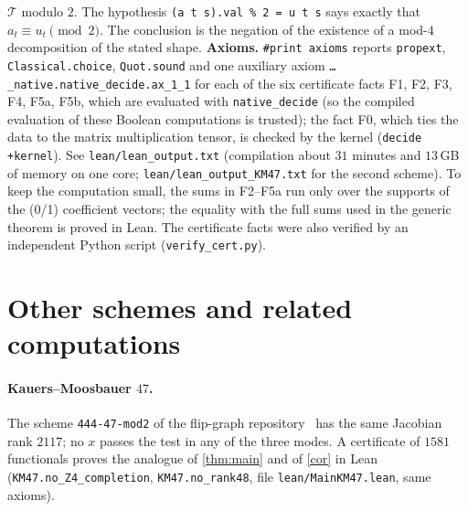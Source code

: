 \documentclass[11pt]{article}
\numberwithin{equation}{section}
\theoremstyle{definition}
\theoremstyle{remark}
\newcommand{\T}{\mathcal T}
\begin{document}
$\T$ modulo $2$. The hypothesis \texttt{(a t s).val \% 2 = u t s} says exactly that $a_t\equiv u_t\pmod 2$.
The conclusion is the negation of the existence of a mod-$4$ decomposition of the stated shape.
\textbf{Axioms.} \texttt{\#print axioms} reports \texttt{propext}, \texttt{Classical.choice},
\texttt{Quot.sound} and one auxiliary axiom \texttt{\dots\_native.native\_decide.ax\_1\_1} for each of
the six certificate facts F1, F2, F3, F4, F5a, F5b, which are evaluated with \texttt{native\_decide}
(so the compiled evaluation of these Boolean computations is trusted); the fact F0, which ties the data
to the matrix multiplication tensor, is checked by the kernel (\texttt{decide +kernel}).
See \texttt{lean/lean\_output.txt} (compilation about $31$ minutes and $13$\,GB of memory on one core;
\texttt{lean/lean\_output\_KM47.txt} for the second scheme).
To keep the computation small, the sums in F2--F5a run only over the supports of the (0/1) coefficient
vectors; the equality with the full sums used in the generic theorem is proved in Lean. The certificate facts were also verified by an independent Python
script (\texttt{verify\_cert.py}).

\section{Other schemes and related computations}\label{sec:other}
\paragraph{Kauers--Moosbauer $47$.} The scheme \texttt{444-47-mod2} of the flip-graph repository~\cite{kmflip}
has the same Jacobian rank $2117$; no $x$ passes the test in any of the three modes. A certificate of
$1581$ functionals proves the analogue of \cref{thm:main} and of \cref{cor} in Lean
(\texttt{KM47.no\_Z4\_completion}, \texttt{KM47.no\_rank48}, file \texttt{lean/MainKM47.lean}, same axioms).
\end{document}
